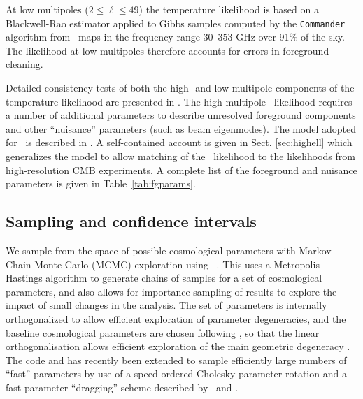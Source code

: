 At low multipoles ($2 \le \ell \le 49$) the temperature likelihood is
based on a Blackwell-Rao estimator applied to Gibbs samples computed
by the {\tt Commander} algorithm \citep{Eriksen:08} from \planck\ maps
in the frequency range $30$--$353$ GHz over 91\% of the sky. The likelihood
at low multipoles therefore accounts for errors in foreground cleaning.

Detailed consistency tests of both the high- and low-multipole components
of the temperature likelihood are presented in \cite{planck2013-p08}.
The high-multipole \planck\ likelihood requires a number of additional
parameters to describe unresolved foreground components and other
``nuisance'' parameters (such as beam eigenmodes). The model adopted
for \planck\ is described in \cite{planck2013-p08}. A self-contained
account is given in Sect. \ref{sec:highell} which generalizes the model
to allow matching of the \planck\ likelihood to the likelihoods from
high-resolution CMB experiments. A complete list of the foreground
and  nuisance parameters is given in Table~\ref{tab:fgparams}.





\subsection{Sampling and confidence intervals}

We sample from the space of possible cosmological parameters with
Markov Chain Monte Carlo (MCMC) exploration using
\COSMOMC~\citep{Lewis:2002ah}.
This uses a Metropolis-Hastings algorithm to generate chains of samples
for a set of cosmological parameters, and also allows for importance
sampling of results to explore the impact of small changes in the analysis.
The set of parameters is internally orthogonalized to allow efficient
exploration of parameter degeneracies, and the baseline cosmological
parameters are chosen following \citet{Kosowsky:2002zt}, so that the
linear orthogonalisation allows efficient exploration of the main
geometric degeneracy \citep{Bond:97}.
The code  and has recently been extended to sample efficiently
large numbers of ``fast'' parameters by use of a speed-ordered Cholesky
parameter rotation and a fast-parameter ``dragging'' scheme described
by~\cite{Neal04} and \cite{Lewis:2013hha}.

